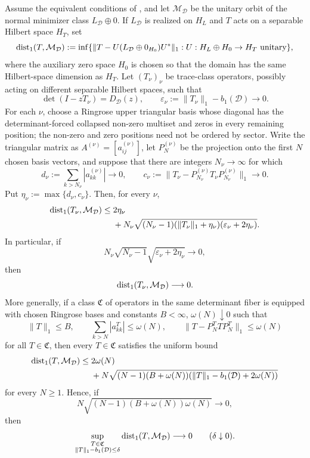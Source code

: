 \begin{theorem}
  \label{thm:tail-localized-orbit-distance}
  Assume the equivalent conditions of
  , and let
  \(\mathcal M_{\mathcal D}\) be the unitary orbit of the normal minimizer class
  \(L_{\mathcal D}\oplus0\).  If \(L_{\mathcal D}\) is realized on
  \(H_L\) and \(T\) acts on a separable Hilbert space \(H_T\), set
  \[
    \operatorname{dist}_1(T,\mathcal M_{\mathcal D})
      :=\inf\{\|T-U(L_{\mathcal D}\oplus0_{H_0})U^*\|_1:
      U:H_L\oplus H_0\to H_T\text{ unitary}\},
  \]
  where the auxiliary zero space \(H_0\) is chosen so that the domain has the
  same Hilbert-space dimension as \(H_T\).  Let \((T_\nu)_\nu\) be trace-class operators,
  possibly acting on different separable Hilbert spaces, such that
  \[
    \det(I-zT_\nu)=D_{\mathcal D}(z),
    \qquad
    \varepsilon_\nu:=\|T_\nu\|_1-b_1(\mathcal D)\longrightarrow0 .
  \]
  For each \(\nu\), choose a Ringrose upper triangular basis whose diagonal has
  the determinant-forced collapsed non-zero multiset and zeros in every
  remaining position; the non-zero and zero positions need not be ordered by
  sector.  Write the triangular matrix as \(A^{(\nu)}=[a_{ij}^{(\nu)}]\), let
  \(P_N^{(\nu)}\) be the projection onto the first \(N\) chosen basis vectors,
  and suppose that there are integers \(N_\nu\to\infty\) for which
  \[
    d_\nu:=\sum_{k>N_\nu}|a_{kk}^{(\nu)}|\longrightarrow0,
    \qquad
    c_\nu:=\|T_\nu-P_{N_\nu}^{(\nu)}T_\nu P_{N_\nu}^{(\nu)}\|_1
      \longrightarrow0 .
  \]
  Put \(\eta_\nu:=\max\{d_\nu,c_\nu\}\).  Then, for every \(\nu\),
  \[
  \begin{split}
    \operatorname{dist}_1(T_\nu,\mathcal M_{\mathcal D})
    \le{}&2\eta_\nu \\
    &+N_\nu\sqrt{(N_\nu-1)(\|T_\nu\|_1+
      \eta_\nu)(\varepsilon_\nu+2\eta_\nu)} .
  \end{split}
  \]
  In particular, if
  \[
    N_\nu\sqrt{N_\nu-1}
      \sqrt{\varepsilon_\nu+2\eta_\nu}\longrightarrow0,
  \]
  then
  \[
    \operatorname{dist}_1(T_\nu,\mathcal M_{\mathcal D})\longrightarrow0 .
  \]
  More generally, if a class \(\mathfrak C\) of operators in the same
  determinant fiber is equipped with chosen Ringrose bases and constants
  \(B<\infty\), \(\omega(N)\downarrow0\) such that
  \[
    \|T\|_1\le B,
    \qquad
    \sum_{k>N}|a_{kk}^T|\le\omega(N),
    \qquad
    \|T-P_N^TT P_N^T\|_1\le\omega(N)
  \]
  for all \(T\in\mathfrak C\), then every
  \(T\in\mathfrak C\) satisfies the uniform bound
  \[
  \begin{split}
    \operatorname{dist}_1(T,\mathcal M_{\mathcal D})
    \le{}&2\omega(N)\\
    &+N\sqrt{(N-1)(B+
      \omega(N))(\|T\|_1-b_1(\mathcal D)+2\omega(N))}
  \end{split}
  \]
  for every \(N\ge1\).  Hence, if
  \[
    N\sqrt{(N-1)(B+
      \omega(N))\omega(N)}\longrightarrow0,
  \]
  then
  \[
    \sup_{\substack{T\in\mathfrak C\\
      \|T\|_1-b_1(\mathcal D)\le\delta}}
      \operatorname{dist}_1(T,\mathcal M_{\mathcal D})\longrightarrow0
    \qquad(\delta\downarrow0).
  \]
\end{theorem}

